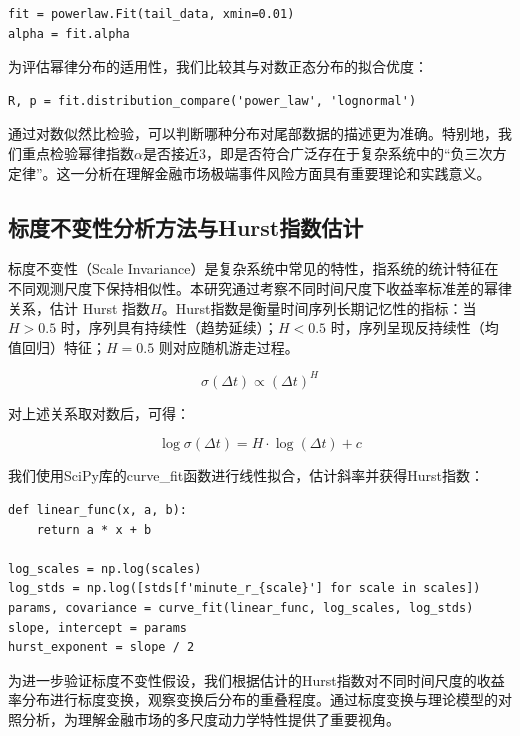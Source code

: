 \documentclass[12pt, a4paper]{article}
\begin{document}
\begin{verbatim}
fit = powerlaw.Fit(tail_data, xmin=0.01)
alpha = fit.alpha
\end{verbatim}

为评估幂律分布的适用性，我们比较其与对数正态分布的拟合优度：

\begin{verbatim}
R, p = fit.distribution_compare('power_law', 'lognormal')
\end{verbatim}

通过对数似然比检验，可以判断哪种分布对尾部数据的描述更为准确。特别地，我们重点检验幂律指数$\alpha$是否接近3，即是否符合广泛存在于复杂系统中的“负三次方定律”。这一分析在理解金融市场极端事件风险方面具有重要理论和实践意义。

\subsection{标度不变性分析方法与Hurst指数估计}

标度不变性（Scale Invariance）是复杂系统中常见的特性，指系统的统计特征在不同观测尺度下保持相似性。本研究通过考察不同时间尺度下收益率标准差的幂律关系，估计 Hurst 指数$H$。Hurst指数是衡量时间序列长期记忆性的指标：当 \(H > 0.5\) 时，序列具有持续性（趋势延续）；\(H < 0.5\) 时，序列呈现反持续性（均值回归）特征；\(H = 0.5\) 则对应随机游走过程。

\begin{equation}
\sigma(\Delta t) \propto (\Delta t)^H
\end{equation}

对上述关系取对数后，可得：

\begin{equation}
\log \sigma(\Delta t) = H \cdot \log(\Delta t) + c
\end{equation}

我们使用SciPy库的curve\_fit函数进行线性拟合，估计斜率并获得Hurst指数：

\begin{verbatim}
def linear_func(x, a, b):
    return a * x + b

log_scales = np.log(scales)
log_stds = np.log([stds[f'minute_r_{scale}'] for scale in scales])
params, covariance = curve_fit(linear_func, log_scales, log_stds)
slope, intercept = params
hurst_exponent = slope / 2
\end{verbatim}

为进一步验证标度不变性假设，我们根据估计的Hurst指数对不同时间尺度的收益率分布进行标度变换，观察变换后分布的重叠程度。通过标度变换与理论模型的对照分析，为理解金融市场的多尺度动力学特性提供了重要视角。
\end{document}
